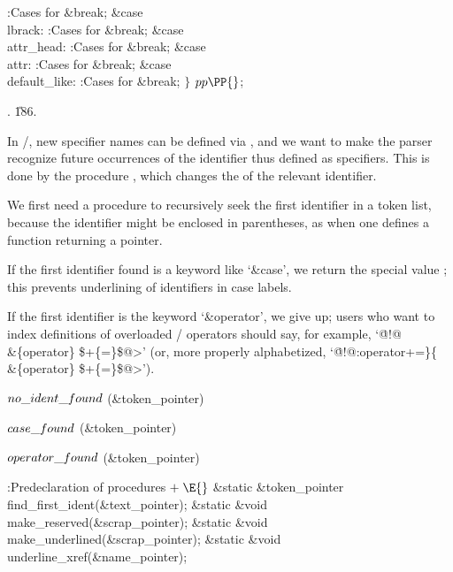 :Cases for \X\5
\&{break};\6
\4\&{case} \\{lbrack}:\5
:Cases for \X\5
\&{break};\6
\4\&{case} \\{attr\_head}:\5
:Cases for \X\5
\&{break};\6
\4\&{case} \\{attr}:\5
:Cases for \X\5
\&{break};\6
\4\&{case} \\{default\_like}:\5
:Cases for \X\5
\&{break};\6
\4${}\}{}$\2\2\6
${}\\{pp}\PP{}$;\par
{}.
\U186.\fi

In \CEE/, new specifier names can be defined via , and
we want
to make the parser recognize future occurrences of the identifier thus
defined as specifiers.  This is done by the procedure ,
which changes the  of the relevant identifier.

We first need a procedure to recursively seek the first
identifier in a token list, because the identifier might
be enclosed in parentheses, as when one defines a function
returning a pointer.

If the first identifier found is a keyword like `\&{case}', we
return the special value ; this prevents underlining
of identifiers in case labels.

If the first identifier is the keyword `\&{operator}', we give up;
users who want to index definitions of overloaded \CPLUSPLUS/ operators
should say, for example, `\.{@!@\^\\\&\{operator\} \$+\{=\}\$@>}' (or,
more properly alpha\-betized,
`\.{@!@:operator+=\}\{\\\&\{operator\} \$+\{=\}\$@>}').

\Y\B\4\D$\\{no\_ident\_found}$ \5
(\&{token\_pointer})\,\par
\B\4\D$\\{case\_found}$ \5
(\&{token\_pointer})\,\par
\B\4\D$\\{operator\_found}$ \5
(\&{token\_pointer})\,\par
\Y\B\4:Predeclaration of procedures\X${}\mathrel+\E{}$\6
\&{static} \&{token\_pointer} \\{find\_first\_ident}(\&{text\_pointer});\6
\&{static} \&{void} \\{make\_reserved}(\&{scrap\_pointer});\6
\&{static} \&{void} \\{make\_underlined}(\&{scrap\_pointer});\6
\&{static} \&{void} \\{underline\_xref}(\&{name\_pointer});\par
\fi

